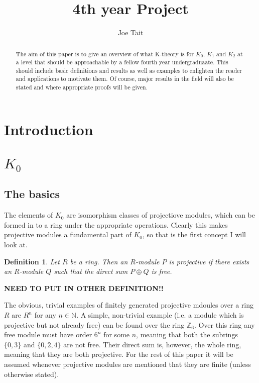 \documentclass[a4paper,10pt]{article}
\title{4th year Project}
\author{Joe Tait}
\newtheorem{defn}[thm]{Definition}
\begin{document}
\maketitle
\setcounter{section}{0}

\begin{abstract}
The aim of this paper is to give an overview of what K-theory is for $K_{0}$, $K_{1}$ and $K_{2}$ at a level that should be approachable by a fellow fourth year undergraduaate. This should include basic definitions and results as well as examples to enlighten the reader and applications to motivate them. Of course, major results in the field will also be stated and where appropriate proofs will be given.
\end{abstract}

\section{Introduction}

\section{$K_{0}$}

\subsection{The basics}

The elements of $K_{0}$ are isomorphism classes of projectiove modules, which can be formed in to a ring under the appropriate operations. Clearly this makes projective modules a fundamental part of $K_{0}$, so that is the first concept I will look at.

\begin{defn}
	Let $R$ be a ring. Then an $R$-module $P$ is projective if there exists an $R$-module $Q$ such that the direct sum $P\oplus Q$ is free.
\end{defn}

\textbf{NEED TO PUT IN OTHER DEFINITION!!}


The obvious, trivial examples of finitely generated projective mdoules over a ring $R$ are $R^n$ for any $n\in \mathbb{N}$. A simple, non-trivial example (i.e. a module which is projective but not already free) can be found over the ring $\mathbb{Z}_6$. Over this ring any free module must have order $6^n$ for some $n$, meaning that both the subrings $\{0,3\}$ and $\{0,2,4\}$ are not free. Their direct sum is, however, the whole ring, meaning that they are both projective. For the rest of this paper it will be assumed whenever projective modules are mentioned that they are finite (unless otherwise stated).
\end{document}
